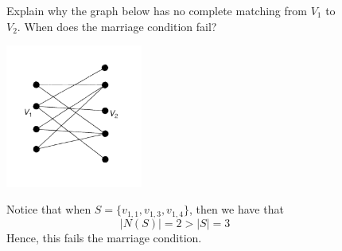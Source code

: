 \begin{figure}[ht]
\begin{nexample}
  Explain why the graph below has no complete matching from \(V_1\) to \(V_2\).
  When does the marriage condition fail?

  \begin{center}
    \includegraphics[width=0.4\textwidth]{figures/l07/marriage-fails.png}
  \end{center}

  Notice that when \(S = \{v_{1,1}, v_{1,3}, v_{1,4}\}\), then we have that 
  \[ |N(S)| = 2 > |S| = 3 \] 
  Hence, this fails the marriage condition.
\end{nexample}
\end{figure}
